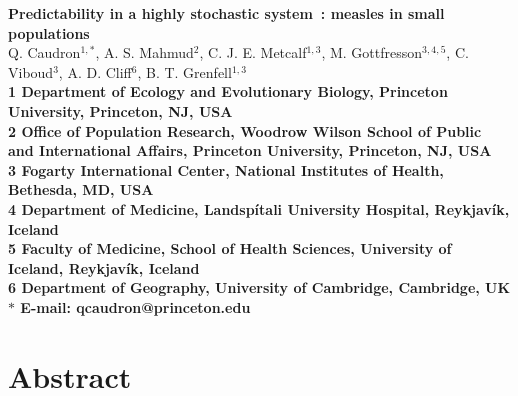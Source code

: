 \documentclass[10pt]{article}
\date{}
\begin{document}
\begin{flushleft}
{\Large
\textbf{Predictability in a highly stochastic system~: measles in small populations}
}
\\
Q. Caudron$^{1,\ast}$, 
A. S. Mahmud$^{2}$, 
C. J. E. Metcalf$^{1,3}$,
M. Gottfre{\dh}sson$^{3,4,5}$,
C. Viboud$^{3}$,
A. D. Cliff$^{6}$,
B. T. Grenfell$^{1,3}$
\\
\bf{1} Department of Ecology and Evolutionary Biology, Princeton University, Princeton, NJ, USA
\\
\bf{2} Office of Population Research, Woodrow Wilson School of Public and International Affairs, Princeton University, Princeton, NJ, USA
\\
\bf{3} Fogarty International Center, National Institutes of Health, Bethesda, MD, USA
\\
\bf{4} Department of Medicine, Landsp\'{i}tali University Hospital, Reykjav\'{i}k, Iceland
\\
\bf{5} Faculty of Medicine, School of Health Sciences, University of Iceland, Reykjav\'{i}k, Iceland
\\
\bf{6} Department of Geography, University of Cambridge, Cambridge, UK
\\
$\ast$ E-mail: qcaudron@princeton.edu
\end{flushleft}













\section*{Abstract}
\end{document}
